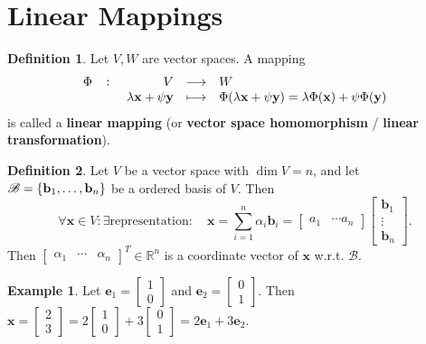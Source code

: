 \documentclass[12pt,openany]{book}
\theoremstyle{definition}
\newtheorem{definition}{Definition}[chapter]
\newtheorem{example}{Example}[chapter]
\newcommand{\R}{\mathbb{R}}
\newcommand{\basis}{\mathscr{B}}
\renewcommand{\vec}[1]{\textbf{#1}}
\begin{document}
	\section{Linear Mappings}
		\begin{tcolorbox}[colframe=defcolor,title={\color{white}\bf Linear Mapping}]
		\begin{definition}
			Let $V,W$ are vector spaces. A mapping \[
			\fullfunction{\Phi}{V}{W}{\lambda\vec{x}+\psi\vec{y}}{\Phi(\lambda\vec{x}+\psi\vec{y})=\lambda\Phi(\vec{x})+\psi\Phi(\vec{y})}
			\] is called a \textbf{linear mapping} (or \textbf{vector space homomorphism} / \textbf{linear transformation}).
		\end{definition}
	\end{tcolorbox}
	\vspace{10pt}
	\begin{tcolorbox}[colframe=defcolor,title={\color{white}\bf Coordinate}]
		\begin{definition}
			Let $V$ be a vector space with $\dim V=n$, and let $\basis=\set{\vec{b}_1,\dots,\vec{b}_n}$ be a ordered basis of $V$. Then \[
			\forall\vec{x}\in V:\exists\text{representation}:\quad\vec{x}=\sum_{i=1}^n\alpha_i\vec{b}_i=\begin{bmatrix}
				a_1&\cdots a_n
			\end{bmatrix}\begin{bmatrix}
				\vec{b}_1\\ \vdots\\ \vec{b}_n
			\end{bmatrix}.
			\] Then $\begin{bmatrix}
				\alpha_1& \cdots& \alpha_n
			\end{bmatrix}^T\in\R^n$ is a coordinate vector of $\vec{x}$ w.r.t. $\basis$.
		\end{definition}
	\end{tcolorbox}
	\begin{example}
		Let $\vec{e}_1=\begin{bmatrix}
			1\\0
		\end{bmatrix}$ and $\vec{e}_2=\begin{bmatrix}
		0\\1
	\end{bmatrix}$. Then $
	\vec{x}=\begin{bmatrix}
	2\\3
\end{bmatrix}=2\begin{bmatrix}
1\\0
\end{bmatrix}+3\begin{bmatrix}
0\\1
\end{bmatrix}=2\vec{e}_1+3\vec{e}_2.$
	\end{example}
\end{document}
